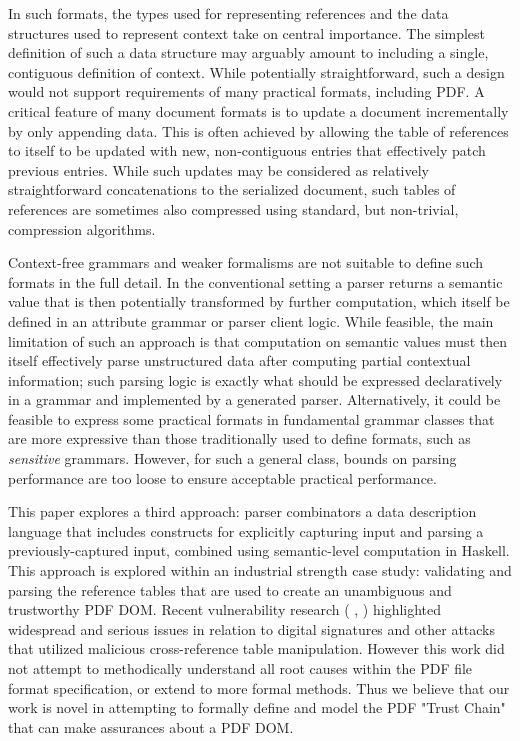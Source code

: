 In such formats, the types used for representing references and the
data structures used to represent context take on central importance.
%
The simplest definition of such a data structure may arguably amount
to including a single, contiguous definition of context.
%
While potentially straightforward, such a design would not support
requirements of many practical formats, including PDF.
%
A critical feature of many document formats is to update a
document incrementally by only appending data. This is often achieved
by allowing the table of references to itself to be updated with new,
non-contiguous entries that effectively patch previous entries.
%
While such updates may be considered as relatively straightforward concatenations to 
the serialized document, such tables of references are sometimes also compressed 
using standard, but non-trivial, compression algorithms.

Context-free grammars and weaker formalisms are not suitable to define
such formats in the full detail.
%
In the conventional setting a parser returns a semantic value
that is then potentially transformed by further computation, which 
itself be defined in an attribute grammar or parser client logic.
%
While feasible, the main limitation of such an approach is that
computation on semantic values must then itself effectively parse
unstructured data after computing partial contextual information;
%
such parsing logic is exactly what should be expressed declaratively
in a grammar and implemented by a generated parser.
%
Alternatively, it could be feasible to express some
practical formats in fundamental grammar classes that are more
expressive than those traditionally used to define formats, such as
\emph{sensitive} grammars.
%
However, for such a general class, bounds on parsing performance are
too loose to ensure acceptable practical performance.

This paper explores a third approach: parser combinators a data
description language that includes constructs for explicitly capturing
input and parsing a previously-captured input, combined using
semantic-level computation in Haskell.
%
This approach is explored within an industrial strength case study:
validating and parsing the reference tables that are used to create 
an unambiguous and trustworthy PDF DOM. Recent vulnerability research (
\cite{rohlmannBreakingSpecificationPDF2021},
\cite{mainkaShadowAttacksHiding2021}) highlighted widespread and serious 
issues in relation to digital signatures and other attacks
that utilized malicious cross-reference table manipulation. However this
work did not attempt to methodically understand all root causes within the PDF
file format specification, or extend to more formal methods. Thus we believe that 
our work is novel in attempting to formally define and model the PDF "Trust Chain" that
can make assurances about a PDF DOM.


